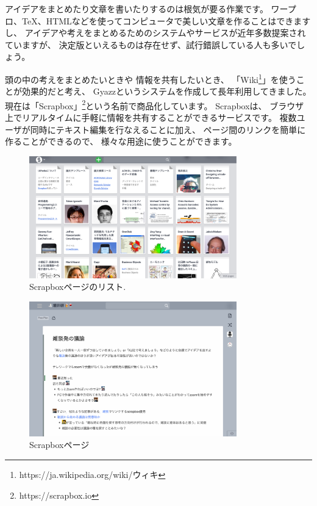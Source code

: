 \documentclass[topics]{compsoft} %
\begin{document}
アイデアをまとめたり文章を書いたりするのは根気が要る作業です。
ワープロ、{\TeX}、HTMLなどを使ってコンピュータで美しい文章を作ることはできますし、
アイデアや考えをまとめるためのシステムやサービスが近年多数提案されていますが、
決定版といえるものは存在せず、試行錯誤している人も多いでしょう。

頭の中の考えをまとめたいときや
情報を共有したいとき、
「Wiki\footnote{
  \textsf{https:{\slash}{\slash}ja.wikipedia.org{\slash}wiki{\slash}ウィキ}
}」を使うことが効果的だと考え、
Gyazz\cite{Gyazz}というシステムを作成して長年利用してきました。
現在は「Scrapbox」\footnote{
  \textsf{https:{\slash}{\slash}scrapbox.io}
}という名前で商品化しています。
Scrapboxは、
ブラウザ上でリアルタイムに手軽に情報を共有することができるサービスです。
複数ユーザが同時にテキスト編集を行なえることに加え、
ページ間のリンクを簡単に作ることができるので、
様々な用途に使うことができます。

\begin{figure}[t]
  \includegraphics[width=9cm,bb=0 0 2607 1535]{figures/13982c755fdc0c60af2548c0a6589543.png}
  \caption{Scrapboxページのリスト.}
  \label{example1}
\end{figure}

\begin{figure}[t]
  \includegraphics[width=9cm,bb=0 0 2235 1452]{figures/cca2e0eaed298ea4952a26d2effa238c.png}
  \caption{Scrapboxページ}
  \label{example1}
\end{figure}
\end{document}

